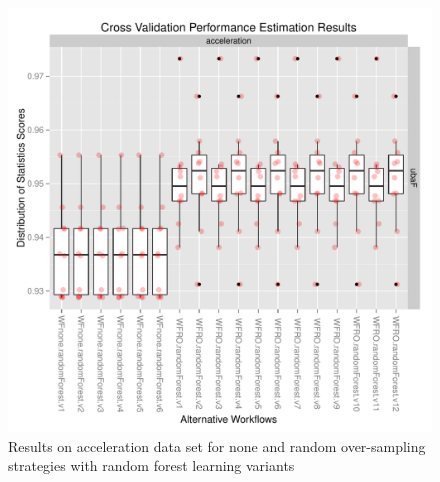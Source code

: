 \documentclass[10pt,a4paper]{article}\usepackage[]{graphicx}\usepackage[]{color}
\makeatletter
\def\maxwidth{ %
  \ifdim\Gin@nat@width>\linewidth
    \linewidth
  \else
    \Gin@nat@width
  \fi
}
\newenvironment{knitrout}{}{} %
\makeatother
\begin{document}
\begin{knitrout}\footnotesize
{}\color{fgcolor}\begin{figure}

{\centering \includegraphics[width=\maxwidth]{figures/UBL-acceleration_plot1-1} 

}

\caption[Results on acceleration data set for none and random over-sampling strategies with random forest learning variants]{Results on acceleration data set for none and random over-sampling strategies with random forest learning variants}\label{fig:acceleration_plot1}
\end{figure}


\end{knitrout}
\end{document}
